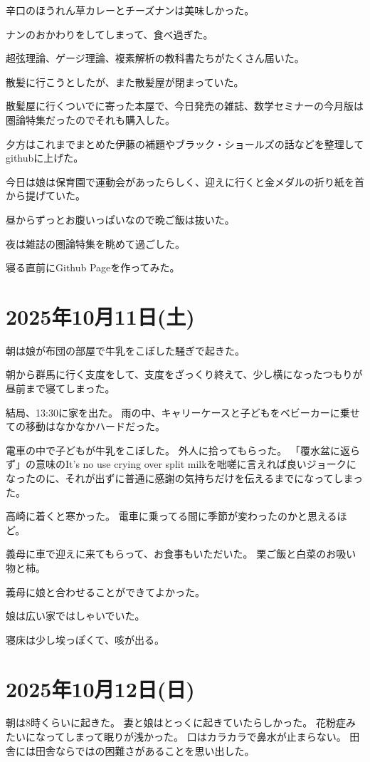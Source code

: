 \documentclass[uplatex]{jsarticle}
\begin{document}
辛口のほうれん草カレーとチーズナンは美味しかった。

ナンのおかわりをしてしまって、食べ過ぎた。

超弦理論、ゲージ理論、複素解析の教科書たちがたくさん届いた。

散髪に行こうとしたが、また散髪屋が閉まっていた。

散髪屋に行くついでに寄った本屋で、今日発売の雑誌、数学セミナーの今月版は圏論特集だったのでそれも購入した。

夕方はこれまでまとめた伊藤の補題やブラック・ショールズの話などを整理してgithubに上げた。

今日は娘は保育園で運動会があったらしく、迎えに行くと金メダルの折り紙を首から提げていた。

昼からずっとお腹いっぱいなので晩ご飯は抜いた。

夜は雑誌の圏論特集を眺めて過ごした。

寝る直前にGithub Pageを作ってみた。

\section{2025年10月11日(土)}

朝は娘が布団の部屋で牛乳をこぼした騒ぎで起きた。

朝から群馬に行く支度をして、支度をざっくり終えて、少し横になったつもりが昼前まで寝てしまった。

結局、13:30に家を出た。
雨の中、キャリーケースと子どもをベビーカーに乗せての移動はなかなかハードだった。

電車の中で子どもが牛乳をこぼした。
外人に拾ってもらった。
「覆水盆に返らず」の意味のIt's no use crying over split milkを咄嗟に言えれば良いジョークになったのに、それが出ずに普通に感謝の気持ちだけを伝えるまでになってしまった。

高崎に着くと寒かった。
電車に乗ってる間に季節が変わったのかと思えるほど。

義母に車で迎えに来てもらって、お食事もいただいた。
栗ご飯と白菜のお吸い物と柿。

義母に娘と合わせることができてよかった。

娘は広い家ではしゃいでいた。

寝床は少し埃っぽくて、咳が出る。

\section{2025年10月12日(日)}

朝は8時くらいに起きた。
妻と娘はとっくに起きていたらしかった。
花粉症みたいになってしまって眠りが浅かった。
口はカラカラで鼻水が止まらない。
田舎には田舎ならではの困難さがあることを思い出した。
\end{document}
